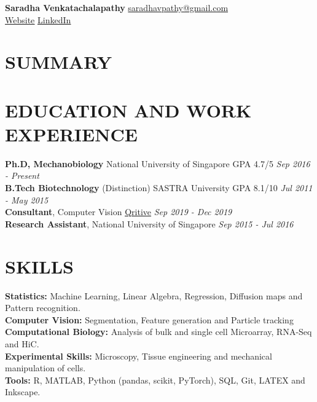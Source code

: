 \documentclass[letterpaper,11pt]{article}
\begin{document}
\begin{flushleft}
{\LARGE {\bf Saradha Venkatachalapathy}} \hfill  {\href{mailto:saradhavpathy@gmail.com}{saradhavpathy@gmail.com}}\\
{ }\hfill {\href{https://saradhavenkatachalapathy.github.io/}{\underline {Website}}}{ }
  {\textbar}{ }{\href{https://www.linkedin.com/in/saradhav/}{\underline {LinkedIn}}} \\
 \end{flushleft}
\section{\bf SUMMARY}


\vspace{0.8mm}
\section{\bf EDUCATION AND WORK EXPERIENCE}
{\bf Ph.D, Mechanobiology }{\textbar}{ National University of Singapore }{\textbar}{ GPA 4.7/5} \hfill {\em Sep 2016 - Present} 
\\
{\bf B.Tech Biotechnology }{(Distinction) }{\textbar}{ SASTRA University }{\textbar}{ GPA 8.1/10} \hfill {\em Jul 2011 - May 2015} 
\\
{\bf Consultant}{, Computer Vision }{\textbar}{ }\href{https://www.qritive.com/}{\underline {Qritive}} \hfill {\em Sep 2019 - Dec 2019} 
\\
{\bf Research Assistant}{, National University of Singapore }
\hfill {\em Sep 2015 - Jul 2016} 

\vspace{0.8mm}
\section{\bf SKILLS}
{\bf Statistics: }{Machine Learning, Linear Algebra, Regression, Diffusion maps and Pattern recognition.}
\\
{\bf Computer Vision: }{Segmentation, Feature generation and Particle tracking}
\\
{\bf Computational Biology: }{Analysis of bulk and single cell Microarray, RNA-Seq and HiC.}
\\
{\bf Experimental Skills: }{Microscopy, Tissue engineering and mechanical manipulation of cells.}
\\
{\bf Tools: }{R, MATLAB, Python (pandas, scikit, PyTorch), SQL, Git, LATEX and Inkscape.}
\vspace{0.8mm}
\end{document}
